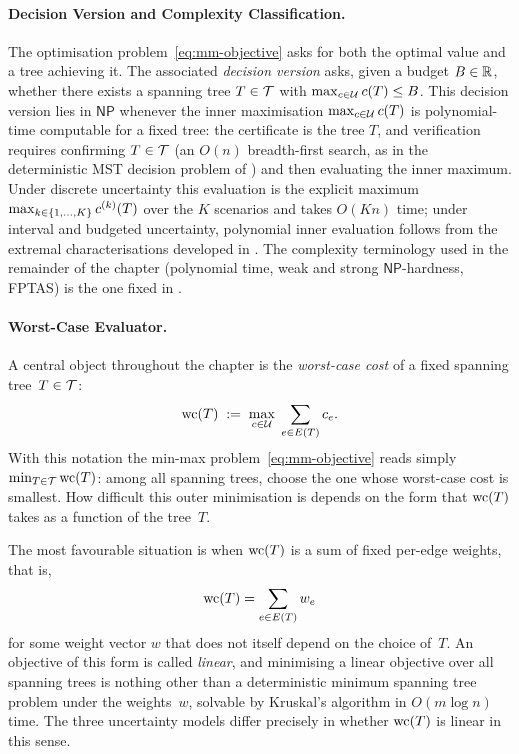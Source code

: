 \paragraph{Decision Version and Complexity Classification.}

The optimisation problem~\eqref{eq:mm-objective} asks for both the optimal value and a tree achieving it.
The associated \emph{decision version} asks, given a budget $B \in \mathbb{R}$, whether there exists a spanning tree $T \in \mathcal{T}$ with $\max_{c \in \mathcal{U}} c(T) \leq B$.
This decision version lies in $\mathsf{NP}$ whenever the inner maximisation $\max_{c \in \mathcal{U}} c(T)$ is polynomial-time computable for a fixed tree: the certificate is the tree $T$, and verification requires confirming $T \in \mathcal{T}$ (an $O(n)$ breadth-first search, as in the deterministic MST decision problem of ) and then evaluating the inner maximum.
Under discrete uncertainty this evaluation is the explicit maximum $\max_{k \in \{1, \ldots, K\}} c^{(k)}(T)$ over the $K$ scenarios and takes $O(Kn)$ time; under interval and budgeted uncertainty, polynomial inner evaluation follows from the extremal characterisations developed in .
The complexity terminology used in the remainder of the chapter (polynomial time, weak and strong $\mathsf{NP}$-hardness, FPTAS) is the one fixed in .

\paragraph{Worst-Case Evaluator.}

A central object throughout the chapter is the \emph{\textcolor{RWTHBlue}{worst-case cost}} of a fixed spanning tree~$T \in \mathcal{T}$:
\begin{equation}\label{eq:mm-evaluator}
\mathrm{wc}(T) \;:=\; \max_{c \in \mathcal{U}}\; \sum_{e \in E(T)} c_e.
\end{equation}
With this notation the min-max problem~\eqref{eq:mm-objective} reads simply $\min_{T \in \mathcal{T}} \mathrm{wc}(T)$: among all spanning trees, choose the one whose worst-case cost is smallest.
How difficult this outer minimisation is depends on the form that $\mathrm{wc}(T)$ takes as a function of the tree~$T$.

The most favourable situation is when $\mathrm{wc}(T)$ is a sum of fixed per-edge weights, that is,
\[
\mathrm{wc}(T) = \sum_{e \in E(T)} w_e
\]
for some weight vector $w$ that does not itself depend on the choice of~$T$.
An objective of this form is called \emph{linear}, and minimising a linear objective over all spanning trees is nothing other than a deterministic minimum spanning tree problem under the weights~$w$, solvable by Kruskal's algorithm in $O(m \log n)$ time.
The three uncertainty models differ precisely in whether $\mathrm{wc}(T)$ is linear in this sense.

